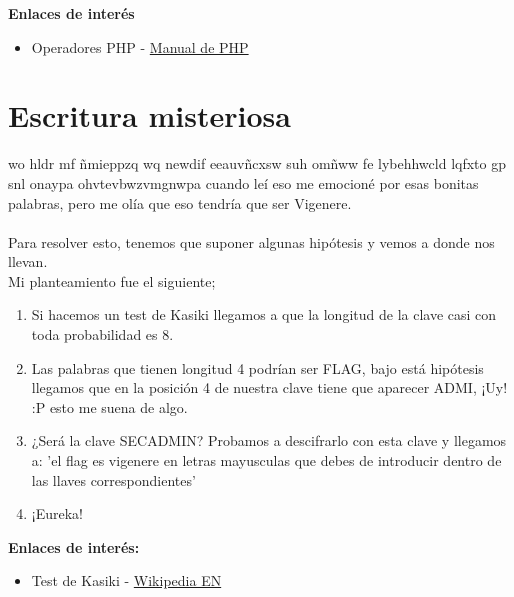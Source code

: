 \documentclass[11pt, spanish]{report}
\begin{document}
\textbf{Enlaces de interés}
\begin{itemize}
	\item Operadores PHP - \href{https://secure.php.net/manual/es/language.operators.comparison.php}{Manual de PHP}
\end{itemize}

\section*{Escritura misteriosa}
wo hldr mf ñmieppzq wq newdif eeauvñcxsw suh omñww fe lybehhwcld lqfxto gp snl onaypa ohvtevbwzvmgnwpa cuando leí eso me emocioné por esas bonitas palabras, pero me olía que eso tendría que ser Vigenere. \\ \\
Para resolver esto, tenemos que suponer algunas hipótesis y vemos a donde nos llevan. \\
Mi planteamiento fue el siguiente;
\begin{enumerate}
	\item Si hacemos un test de Kasiki llegamos a que la longitud de la clave casi con toda probabilidad es 8.
	\item Las palabras que tienen longitud 4 podrían ser FLAG, bajo está hipótesis llegamos que en la posición 4 de nuestra clave tiene que aparecer ADMI, ¡Uy! :P esto me suena de algo.
	\item ¿Será la clave SECADMIN? Probamos a descifrarlo con esta clave y llegamos a: 'el flag es vigenere en letras mayusculas que debes de introducir dentro de las llaves correspondientes'
	\item ¡Eureka!
\end{enumerate}
\textbf{Enlaces de interés:}
\begin{itemize}
	\item Test de Kasiki - \href{https://en.wikipedia.org/wiki/Kasiski_examination}{Wikipedia EN}
\end{itemize}
\end{document}
